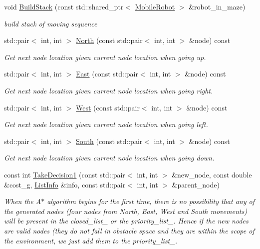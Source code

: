 \begin{DoxyCompactItemize}
void \mbox{\hyperlink{class_maze_a7406014898ccd2dc613377b1b0f7ad60}{Build\+Stack}} (const std\+::shared\+\_\+ptr$<$ \mbox{\hyperlink{class_mobile_robot}{Mobile\+Robot}} $>$ \&robot\+\_\+in\+\_\+maze)
\begin{DoxyCompactList}\small\item\em build stack of moving sequence \end{DoxyCompactList}\item 
std\+::pair$<$ int, int $>$ \mbox{\hyperlink{class_maze_a17057893cca3bd647794171bd7bfb577}{North}} (const std\+::pair$<$ int, int $>$ \&node) const
\begin{DoxyCompactList}\small\item\em Get next node location given current node location when going up. \end{DoxyCompactList}\item 
std\+::pair$<$ int, int $>$ \mbox{\hyperlink{class_maze_a6c85c90908bbff0e89ffb23be8e40873}{East}} (const std\+::pair$<$ int, int $>$ \&node) const
\begin{DoxyCompactList}\small\item\em Get next node location given current node location when going right. \end{DoxyCompactList}\item 
std\+::pair$<$ int, int $>$ \mbox{\hyperlink{class_maze_a4c45ee7fc87f1c72bb8893106dbb0630}{West}} (const std\+::pair$<$ int, int $>$ \&node) const
\begin{DoxyCompactList}\small\item\em Get next node location given current node location when going left. \end{DoxyCompactList}\item 
std\+::pair$<$ int, int $>$ \mbox{\hyperlink{class_maze_a46058cfa97b0d34fd45ff3d4508731bf}{South}} (const std\+::pair$<$ int, int $>$ \&node) const
\begin{DoxyCompactList}\small\item\em Get next node location given current node location when going down. \end{DoxyCompactList}\item 
const int \mbox{\hyperlink{class_maze_a15993fbcbcdb98d56a80d58339aae2a2}{Take\+Decision1}} (const std\+::pair$<$ int, int $>$ \&new\+\_\+node, const double \&cost\+\_\+g, \mbox{\hyperlink{struct_list_info}{List\+Info}} \&info, const std\+::pair$<$ int, int $>$ \&parent\+\_\+node)
\begin{DoxyCompactList}\small\item\em When the A$\ast$ algorithm begins for the first time, there is no possibility that any of the generated nodes (four nodes from North, East, West and South movements) will be present in the closed\+\_\+list\+\_\+ or the priority\+\_\+list\+\_\+. Hence if the new nodes are valid nodes (they do not fall in obstacle space and they are within the scope of the environment, we just add them to the priority\+\_\+list\+\_\+. \end{DoxyCompactList}\item 

\end{DoxyCompactItemize}
